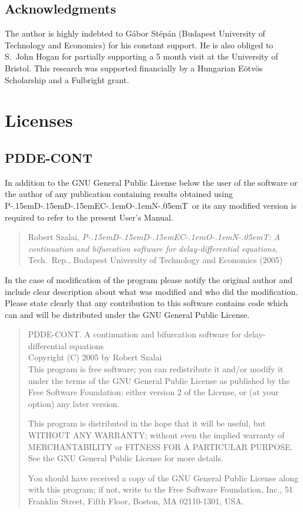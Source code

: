 \documentclass[10pt,a4paper]{ddedoc}
\def\pdde{{P\kern-.15emD\kern-.15emD\kern-.15emE\raisebox{.25ex}{-}C\kern-.1emO\kern-.1emN\kern-.05emT}}
\begin{document}
\subsection*{Acknowledgments}

The author is highly indebted to G\'abor St\'ep\'an (Budapest University of 
Technology and Economics) for his constant support. He is also
obliged to S.~John Hogan for partially supporting a 5 month visit at the University of Bristol.
This research was supported financially by a Hungarian E\"otv\"os Scholarship and a Fulbright grant.

\appendix

\section{Licenses}

\subsection{PDDE-CONT}

In addition to the GNU General Public License below the user of the software or the author of any
publication containing results obtained using \pdde\ or its any modified version is 
required to refer to the present User's Manual.
\begin{quote}
Robert Szalai, \emph{\pdde : A continuation and bifurcation software for 
delay-differential equations}, Tech.\ Rep., Budapest University of Technology and Economics (2005)
\end{quote}
In the case of modification of the program please notify the original author and include clear description about what was modified and who did the 
modification. Please state clearly that any contribution to this software contains code which can and will be distributed under the GNU General Public License.

\begin{quote}
PDDE-CONT. A continuation and bifurcation software for delay-differential equations \\
Copyright (C) 2005 by Robert Szalai \\

This program is free software; you can redistribute it and/or modify
it under the terms of the GNU General Public License as published by
the Free Software Foundation; either version 2 of the License, or
(at your option) any later version.

This program is distributed in the hope that it will be useful,
but WITHOUT ANY WARRANTY; without even the implied warranty of
MERCHANTABILITY or FITNESS FOR A PARTICULAR PURPOSE.  See the
GNU General Public License for more details.

You should have received a copy of the GNU General Public License
along with this program; if not, write to the Free Software
Foundation, Inc., 51 Franklin Street, Fifth Floor, Boston, MA  02110-1301, USA.
\end{quote}
\end{document}
